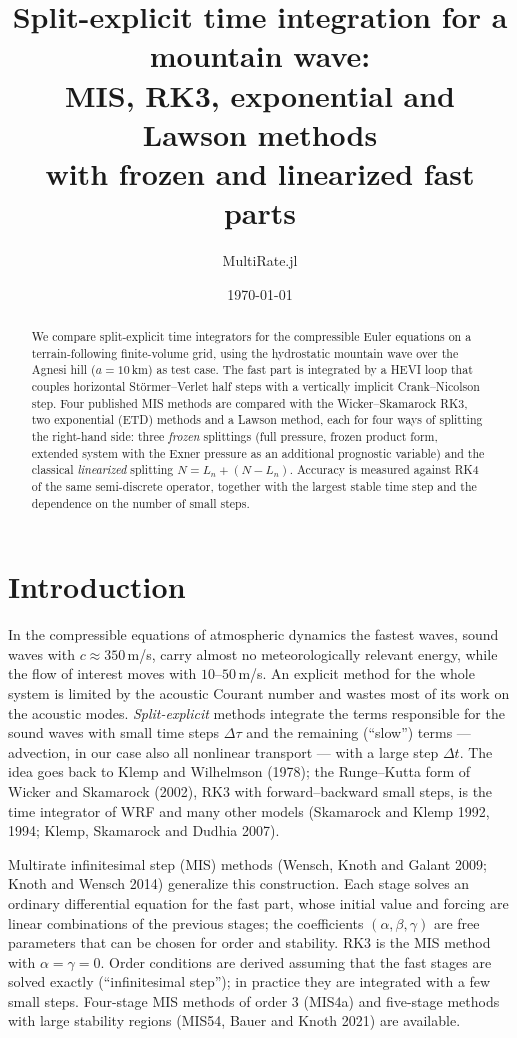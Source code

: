 \documentclass[11pt,a4paper]{article}
\title{Split-explicit time integration for a mountain wave:\\
MIS, RK3, exponential and Lawson methods\\ with frozen and linearized fast parts}
\author{MultiRate.jl}
\date{\today}
\newcommand{\dt}{\Delta t}
\begin{document}
\maketitle

\begin{abstract}
We compare split-explicit time integrators for the compressible Euler equations on a
terrain-following finite-volume grid, using the hydrostatic mountain wave over the Agnesi hill
($a=10$\,km) as test case. The fast part is integrated by a HEVI loop that couples horizontal
St\"ormer--Verlet half steps with a vertically implicit Crank--Nicolson step. Four published MIS
methods are compared with the Wicker--Skamarock RK3, two exponential (ETD) methods and a Lawson
method, each for four ways of splitting the right-hand side: three \emph{frozen} splittings (full
pressure, frozen product form, extended system with the Exner pressure as an additional prognostic
variable) and the classical \emph{linearized} splitting $N=L_n+(N-L_n)$. Accuracy is measured
against RK4 of the same semi-discrete operator, together with the largest stable time step and the
dependence on the number of small steps.
\end{abstract}

\tableofcontents

\section{Introduction}
In the compressible equations of atmospheric dynamics the fastest waves, sound waves with
$c\approx350$\,m/s, carry almost no meteorologically relevant energy, while the flow of interest
moves with $10$--$50$\,m/s. An explicit method for the whole system is limited by the acoustic
Courant number and wastes most of its work on the acoustic modes. \emph{Split-explicit} methods
integrate the terms responsible for the sound waves with small time steps $\Delta\tau$ and the
remaining (``slow'') terms --- advection, in our case also all nonlinear transport --- with a large
step $\dt$. The idea goes back to Klemp and Wilhelmson (1978); the Runge--Kutta form of Wicker and
Skamarock (2002), RK3 with forward--backward small steps, is the time integrator of WRF and many other
models (Skamarock and Klemp 1992, 1994; Klemp, Skamarock and Dudhia 2007).

Multirate infinitesimal step (MIS) methods (Wensch, Knoth and Galant 2009; Knoth and Wensch 2014)
generalize this construction. Each stage solves an ordinary differential equation for the fast part,
whose initial value and forcing are linear combinations of the previous stages; the coefficients
$(\alpha,\beta,\gamma)$ are free parameters that can be chosen for order and stability. RK3 is the MIS
method with $\alpha=\gamma=0$. Order conditions are derived assuming that the fast stages are solved
exactly (``infinitesimal step''); in practice they are integrated with a few small steps. Four-stage
MIS methods of order 3 (MIS4a) and five-stage methods with large stability regions (MIS54, Bauer and
Knoth 2021) are available.
\end{document}
